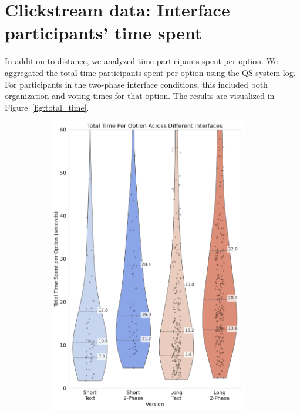 \section{Clickstream data: Interface participants' time spent}
In addition to distance, we analyzed time participants spent per option. We aggregated the total time participants spent per option using the QS system log. For participants in the two-phase interface conditions, this included both organization and voting times for that option. The results are visualized in Figure~\ref{fig:total_time}.

\begin{figure}[h]
    \centering
    \begin{subfigure}[b]{0.52\textwidth}
        \centering
        \includegraphics[width=0.95\textwidth, trim=0 10 0 10, clip]{content/image/results/total_time_per_option.pdf}

\end{subfigure}
\end{figure}
